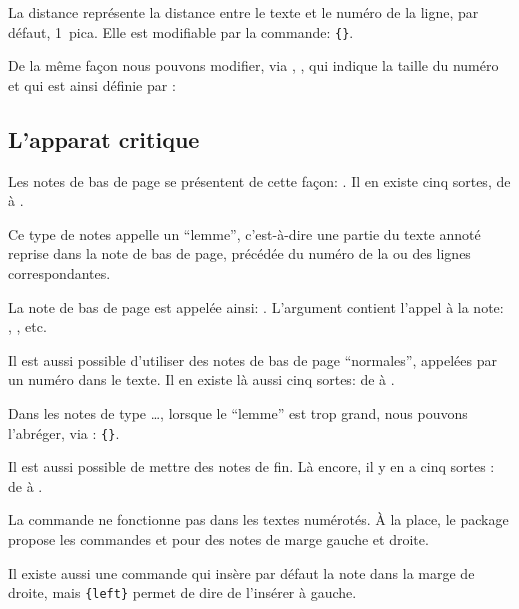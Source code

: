 La distance  représente la distance entre le texte et le numéro de la ligne, par défaut, 1~pica. 
Elle est  modifiable par la commande:
\verb|{|\verb|}|. 

De la même façon nous pouvons modifier, via , , qui indique la taille du numéro et qui est ainsi définie par :

\begin{latexcode}
\newcommand{\numlabfont}{\normalfont\scriptsize}
\end{latexcode}
 

\subsection{L'apparat critique}

Les notes de bas de page se présentent de cette façon:  . Il en existe cinq sortes, de  à .


Ce type de notes appelle un \enquote{lemme}, c'est-à-dire une partie du texte annoté reprise dans la note de bas de page, précédée du numéro de la ou des lignes correspondantes. 

La note de bas de page est appelée ainsi:  
. 
L'argument  contient l'appel à la note: , , etc.

Il est aussi possible d'utiliser  des  notes de bas de page \enquote{normales}, appelées par un numéro dans le texte. Il  en existe là aussi cinq sortes: de  à .

Dans les notes de type \dots, lorsque le \enquote{lemme} est trop grand, nous pouvons l'abréger, via  : 
\verb|{|\verb|}|. 

\begin{plusloins}
Il est aussi possible de mettre des notes de fin. Là encore, il y en a cinq sortes :  de  à .
\end{plusloins}

\begin{plusloins}
La commande  ne fonctionne pas dans les textes numérotés. À la place, le package propose les commandes  et  pour des notes de marge gauche et droite.
\end{plusloins}
\begin{plusloins}
Il existe aussi une commande  qui insère par défaut la note dans la marge de droite, mais \verb={left}= permet de dire de l'insérer à gauche.
\end{plusloins} 

